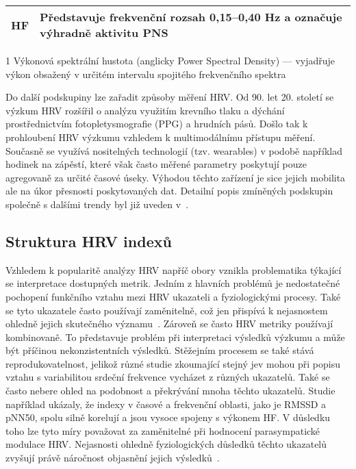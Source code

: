 \begin{table}[!htb]
\begin{threeparttable}
\begin{tabular}{p{2cm}p{12cm}}
            HF       & Představuje frekvenční rozsah 0,15--0,40 Hz a označuje výhradně aktivitu \gls{PNS}                                                                           \\ \bottomrule
        \end{tabular}
        \begin{tablenotes}
            \scriptsize
            \item [1] Výkonová spektrální hustota (anglicky Power Spectral
            Density) --- vyjadřuje výkon obsažený v určitém intervalu spojitého
            frekvenčního spektra
        \end{tablenotes}
    \end{threeparttable}
\end{table}

Do další podskupiny lze zařadit způsoby měření \gls{HRV}. Od 90. let 20. století
se výzkum \gls{HRV} rozšířil o analýzu využitím krevního tlaku a dýchání
prostřednictvím fotopletysmografie (\gls{PPG}) a hrudních pásů. Došlo tak k
prohloubení HRV výzkumu vzhledem k multimodálnímu přístupu měření. Současně se
využívá nositelných technologií (tzv. wearables) v podobě například hodinek na
zápěstí, které však často měřené parametry poskytují pouze agregovaně za určité
časové úseky. Výhodou těchto zařízení je sice jejich mobilita ale na úkor
přesnosti poskytovaných dat. Detailní popis zmíněných podskupin společně s
dalšími trendy byl již uveden v~\cite{Ishaque2021}.

\subsection{Struktura HRV indexů}
\label{subsec:hrv_indices}
Vzhledem k popularitě analýzy \gls{HRV} napříč obory vznikla problematika
týkající se interpretace dostupných metrik. Jedním z hlavních problémů je
nedostatečné pochopení funkčního vztahu mezi \gls{HRV} ukazateli a
fyziologickými procesy. Také se tyto ukazatele často používají zaměnitelně, což
jen přispívá k nejasnostem ohledně jejich skutečného
významu~\cite{Fatisson2016,hayano2019}. Zároveň se často \gls{HRV} metriky
používají kombinovaně. To představuje problém při interpretaci výsledků výzkumu
a může být příčinou nekonzistentních výsledků. Stěžejním procesem se také stává
reprodukovatelnost, jelikož různé studie zkoumající stejný jev mohou při popisu
vztahu s variabilitou srdeční frekvence vycházet z různých ukazatelů. Také se
často nebere ohled na podobnost a překrývání mnoha těchto ukazatelů. Studie
například ukázaly, že indexy v časové a frekvenční oblasti, jako je RMSSD a
pNN50, spolu silně korelují a jsou vysoce spojeny s výkonem HF. V důsledku toho
lze tyto míry považovat za zaměnitelné při hodnocení parasympatické modulace
\gls{HRV}. Nejasnosti ohledně fyziologických důsledků těchto ukazatelů zvyšují
právě náročnost objasnění jejich
výsledků~\cite{Bigger1989,Rohila2020,Malik1996,Ishaque2021}.

